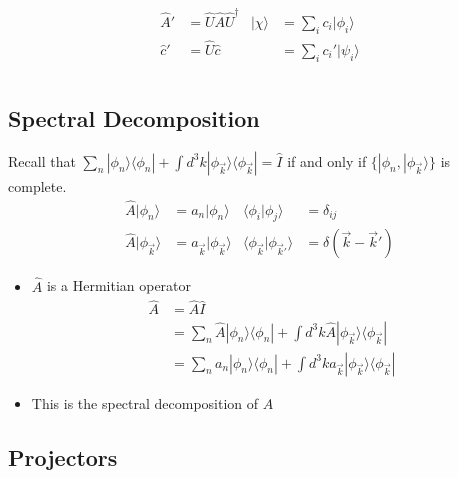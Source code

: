 \documentclass[a4paper,11pt,normalem]{article}
\begin{document}
\[
    \begin{aligned}
    \hat{A}' &= \hat{U}\hat{A}\hat{U}^\dagger & |\chi\rangle &= \sum_i c_i|\phi_i\rangle \\
    \hat{c}' &= \hat{U}\hat{c} & &= \sum_i c_i'|\psi_i\rangle
    \end{aligned}
\]

\section{}\label{lecture-15}

\subsection{Spectral Decomposition}\label{spectral-decomposition}
Recall that
\(\sum_n |\phi_n\rangle\langle\phi_n| + \int d^3k |\phi_{\vec{k}}\rangle\langle\phi_{\vec{k}}| = \hat{I}\)
if and only if \(\{|\phi_n,|\phi_{\vec{k}_{}}\rangle\}\) is complete.
\[
    \begin{aligned}
    \hat{A}|\phi_n\rangle &= a_n|\phi_n\rangle & \langle\phi_i|\phi_j\rangle &= \delta_{ij} \\
    \hat{A}|\phi_{\vec{k}}\rangle &= a_{\vec{k}}|\phi_{\vec{k}}\rangle & \langle \phi_{\vec{k}}|\phi_{\vec{k}'}\rangle &= \delta(\vec{k}-\vec{k}')
    \end{aligned}
\]
\begin{itemize}
\item
  \(\hat{A}\) is a Hermitian operator
\[
    \begin{aligned}
    \hat{A} &= \hat{A}\hat{I} \\
            &= \sum_n \hat{A}|\phi_n\rangle\langle\phi_n| + \int d^3k \hat{A}|\phi_{\vec{k}}\rangle\langle\phi_{\vec{k}}| \\
            &= \sum_n a_n|\phi_n\rangle\langle\phi_n| + \int d^3k a_{\vec{k}}|\phi_{\vec{k}}\rangle\langle\phi_{\vec{k}}|
    \end{aligned}
\]
\item
  This is the spectral decomposition of \(\hat{A}\)
\end{itemize}

\subsection{Projectors}\label{projectors}
\end{document}

